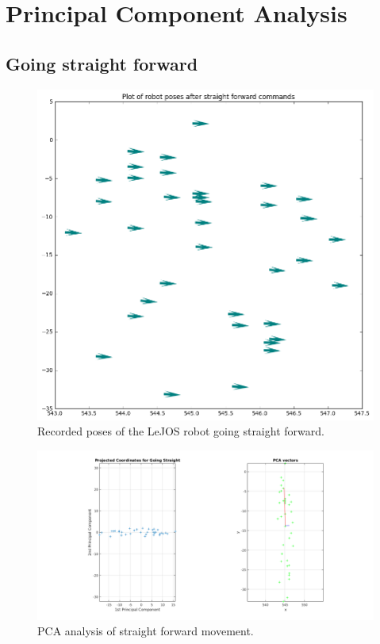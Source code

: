 \documentclass[paper=a4, fontsize=11pt]{scrartcl} %
\title{\hmwkClass \\
       \hmwkTitle}
\author{\hmwkAuthorFullName}
\date{\hmwkDueDate}
\begin{document}
    \maketitle
    \thispagestyle{fancy} %
    
    \section{Principal Component Analysis}

    \subsection{Going straight forward}
    \begin{figure}[H]
        \begin{center}
            \setlength{\fboxsep}{0.5pt} %
            \setlength{\fboxrule}{0.5pt}
            \includegraphics[width=0.7\linewidth,fbox]{images/poses_plot_1_straight.png}
            \caption{Recorded poses of the LeJOS robot going straight forward.}
        \end{center}
    \end{figure}
    \begin{figure}[h!]
        \begin{center}
            \setlength{\fboxsep}{0.5pt} %
            \setlength{\fboxrule}{0.5pt}
            \includegraphics[width=\linewidth,fbox]{images/pca_straight.png}
            \caption{PCA analysis of straight forward movement.}
        \end{center}
    \end{figure}
\end{document}
